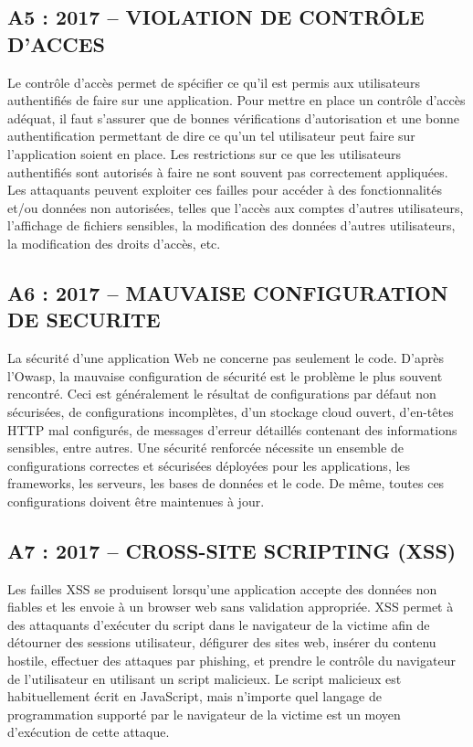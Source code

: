 \subsection*{A5 : 2017 – VIOLATION DE CONTRÔLE D’ACCES}
Le contrôle d’accès permet de spécifier ce qu’il est permis aux utilisateurs authentifiés de faire sur une application. Pour mettre en place un contrôle d’accès adéquat, il faut s’assurer que de bonnes vérifications d’autorisation et une bonne authentification permettant de dire ce qu’un tel utilisateur peut faire sur l’application soient en place.
Les restrictions sur ce que les utilisateurs authentifiés sont autorisés à faire ne sont souvent pas correctement appliquées. Les attaquants peuvent exploiter ces failles pour accéder à des fonctionnalités et/ou données non autorisées, telles que l'accès aux comptes d'autres utilisateurs, l'affichage de fichiers sensibles, la modification des données d'autres utilisateurs, la modification des droits d'accès, etc.
\subsection*{A6 : 2017 – MAUVAISE CONFIGURATION DE SECURITE}
La sécurité d’une application Web ne concerne pas seulement le code. D’après l’Owasp, la mauvaise configuration de sécurité est le problème le plus souvent rencontré. Ceci est généralement le résultat de configurations par défaut non sécurisées, de configurations incomplètes, d'un stockage cloud ouvert, d'en-têtes HTTP mal configurés, de messages d'erreur détaillés contenant des informations sensibles, entre autres. Une sécurité renforcée nécessite un ensemble de configurations correctes et sécurisées déployées pour les applications, les frameworks, les serveurs, les bases de données et le code. De même, toutes ces configurations doivent être maintenues à jour.
\subsection*{A7 : 2017 – CROSS-SITE SCRIPTING (XSS)}
Les failles XSS se produisent lorsqu'une application accepte des données non fiables et les envoie à un browser web sans validation appropriée. XSS permet à des attaquants d'exécuter du script dans le navigateur de la victime afin de détourner des sessions utilisateur, défigurer des sites web, insérer du contenu hostile, effectuer des attaques par phishing, et prendre le contrôle du navigateur de l'utilisateur en utilisant un script malicieux. Le script malicieux est habituellement écrit en JavaScript, mais n'importe quel langage de programmation supporté par le navigateur de la victime est un moyen d’exécution de cette attaque.
